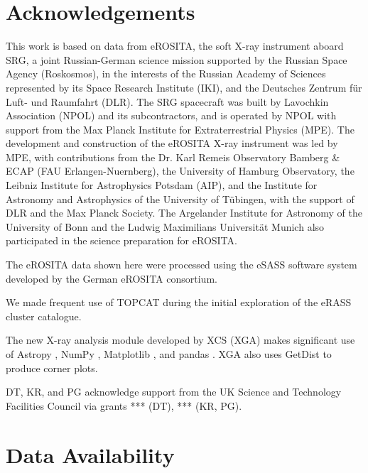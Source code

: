 \documentclass[fleqn,usenatbib]{mnras}
\begin{document}

\section*{Acknowledgements}
This work is based on data from eROSITA, the soft X-ray instrument aboard SRG, a joint Russian-German science mission supported by the Russian Space Agency (Roskosmos), in the interests of the Russian Academy of Sciences represented by its Space Research Institute (IKI), and the Deutsches Zentrum für Luft- und Raumfahrt (DLR). The SRG spacecraft was built by Lavochkin Association (NPOL) and its subcontractors, and is operated by NPOL with support from the Max Planck Institute for Extraterrestrial Physics (MPE). The development and construction of the eROSITA X-ray instrument was led by MPE, with contributions from the Dr. Karl Remeis Observatory Bamberg & ECAP (FAU Erlangen-Nuernberg), the University of Hamburg Observatory, the Leibniz Institute for Astrophysics Potsdam (AIP), and the Institute for Astronomy and Astrophysics of the University of Tübingen, with the support of DLR and the Max Planck Society. The Argelander Institute for Astronomy of the University of Bonn and the Ludwig Maximilians Universität Munich also participated in the science preparation for eROSITA.

The eROSITA data shown here were processed using the eSASS software system developed by the German eROSITA consortium.

We made frequent use of TOPCAT \citep[][]{topcat} during the initial exploration of the eRASS cluster catalogue.

The new X-ray analysis module developed by XCS (XGA) makes significant use of Astropy \citep[][]{astropy1, astropy2}, NumPy \citep[][]{numpy}, Matplotlib \citep[][]{matplotlib}, and pandas \citep[][]{pandassoftware,pandaspaper}. XGA also uses GetDist \citep[][]{getdist} to produce corner plots.

DT, KR, and PG acknowledge support from the UK Science and Technology Facilities Council via grants {\color{red}***} (DT), {\color{red}***} (KR, PG).
\section*{Data Availability}
\end{document}
